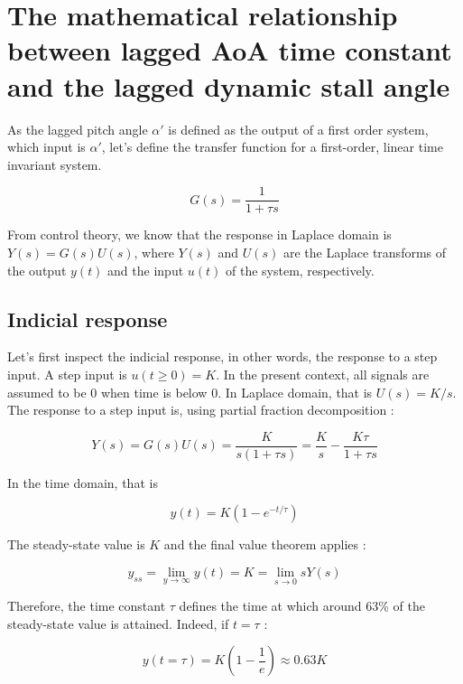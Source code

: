 \documentclass{article}
\begin{document}
\section{The mathematical relationship between lagged AoA time constant and the lagged dynamic stall angle}

As the lagged pitch angle $\alpha'$ is defined as the output of a first order system, which input is $\alpha'$, let's define the transfer function for a first-order, linear time invariant system. 

\begin{equation}
G(s) = \frac{1}{1+\tau s}
\end{equation}

\noindent From control theory, we know that the response in Laplace domain is $Y(s) = G(s)U(s)$, where $Y(s)$ and $U(s)$ are the Laplace transforms of the output $y(t)$ and the input $u(t)$ of the system, respectively.

\subsection{Indicial response}

Let's first inspect the indicial response, in other words, the response to a step input. A step input is $u(t \geq 0) = K$. In the present context, all signals are assumed to be $0$ when time is below 0. In Laplace domain, that is $U(s) = K/s$. The response to a step input is, using partial fraction decomposition : 

\begin{equation}
Y(s) = G(s)U(s) = \frac{K}{s(1+\tau s)} =\frac{K}{s} - \frac{K\tau}{1+\tau s}
\end{equation}

\noindent In the time domain, that is 

\begin{equation}
y(t) = K(1-e^{-t/\tau})
\end{equation}

\noindent The steady-state value is $K$ and the final value theorem applies : 

\begin{equation}
y_{ss} = \lim_{y \rightarrow \infty} y(t) = K = \lim_{s \rightarrow 0} sY(s)
\end{equation}

Therefore, the time constant $\tau$ defines the time at which around 63\% of the steady-state value is attained. Indeed, if $t=\tau$ : 

\begin{equation}
y(t=\tau) = K(1-\frac{1}{e}) \approx 0.63K 
\end{equation}
\end{document}
